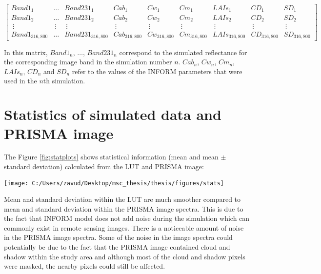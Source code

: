 \documentclass[a4paper, nobind]{templates/ociamthesis}
\let\origfigure\figure
\let\endorigfigure\endfigure
\renewenvironment{figure}[1][2] {
    \expandafter\origfigure\expandafter[H]
} {
    \endorigfigure
}
\begin{document}
\begingroup
\tiny

\[
\begin{bmatrix}
Band1_{1} & \dots & Band231_{1} & Cab_{1} & Cw_{1} & Cm_{1} & LAIs_{1} & CD_{1} & SD_{1}\\
Band1_{2} & \dots & Band231_{2} & Cab_{2} & Cw_{2} & Cm_{2} & LAIs_{2} & CD_{2} & SD_{2}\\
\ \vdots  &\ \vdots &\ \vdots &\ \vdots &\ \vdots &\ \vdots &\ \vdots &\ \vdots &\ \vdots\\
Band1_{316,800} & \dots & Band231_{316,800} & Cab_{316,800} & Cw_{316,800} & Cm_{316,800} & LAIs_{316,800} & CD_{316,800} & SD_{316,800}
\end{bmatrix}
\]
\endgroup

In this matrix, \(Band1_{n}\), \(\dots\), \(Band231_{n}\) correspond to the simulated reflectance for the corresponding image band in the simulation number \(n\). \(Cab_{n}\), \(Cw_{n}\), \(Cm_{n}\), \(LAIs_{n}\), \(CD_{n}\) and \(SD_{n}\) refer to the values of the INFORM parameters that were used in the \(n\)th simulation.

\hypertarget{statistics-of-simulated-data-and-prisma-image-1}{%
\section{Statistics of simulated data and PRISMA image}\label{statistics-of-simulated-data-and-prisma-image-1}}

The Figure \ref{fig:statplots} shows statistical information (mean and mean \(\pm\) standard deviation) calculated from the LUT and PRISMA image:

\begin{figure}
\texttt{[image: C:/Users/zavud/Desktop/msc\_thesis/thesis/figures/stats]} \caption{Mean and mean $\pm$ standard deviation in the a) LUT and b) PRISMA image}\label{fig:statplots}
\end{figure}

Mean and standard deviation within the LUT are much smoother compared to mean and standard deviation within the PRISMA image spectra. This is due to the fact that INFORM model does not add noise during the simulation which can commonly exist in remote sensing images. There is a noticeable amount of noise in the PRISMA image spectra. Some of the noise in the image spectra could potentially be due to the fact that the PRISMA image contained cloud and shadow within the study area and although most of the cloud and shadow pixels were masked, the nearby pixels could still be affected.
\end{document}
